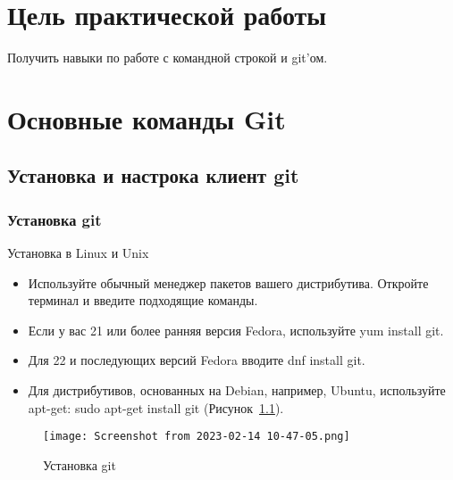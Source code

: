 \graphicspath{{~/Documents/SADT/FirstTask/TheBasics/}}
\chapter*{\LARGE{Цель практической работы}}
Получить навыки по работе с командной строкой и git’ом.

\chapter{Основные команды Git}

\section{Установка и настрока клиент git}
\subsection{Установка git}
Установка в Linux и Unix
\begin{itemize}
	\item Используйте обычный менеджер пакетов вашего дистрибутива.
		Откройте терминал и введите подходящие команды.
	\item Если у вас 21 или более ранняя версия Fedora,
		используйте yum install git.
	\item Для 22 и последующих версий Fedora вводите dnf install git.
	\item Для дистрибутивов, основанных на Debian, например, Ubuntu,
		используйте apt-get: sudo apt-get install git
		(Рисунок~\ref{fig:git:install}).
\end{itemize}
\begin{figure}[h!tp]
	\centering
	\texttt{[image: Screenshot from 2023-02-14 10-47-05.png]}
	\caption{Установка git}
	\label{fig:git:install}
\end{figure}

